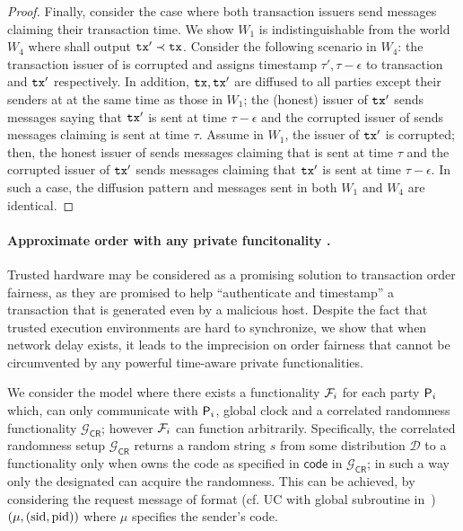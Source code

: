 \begin{proof}
	Finally, consider the case where both transaction issuers send messages claiming their transaction time.
	We show $W_1$ is indistinguishable from the world $W_4$ where \funcFairLedger shall output $\mathtt{tx}' \prec \mathtt{tx}$.
	Consider the following scenario in $W_4$: the transaction issuer of \tx is corrupted and \funcFairLedger assigns timestamp $\tau', \tau - \epsilon$ to transaction \tx and $\mathtt{tx}'$ respectively.
	In addition, $\mathtt{tx}, \mathtt{tx}'$ are diffused to all parties except their senders at at the same time as those in $W_1$; the (honest) issuer of $\mathtt{tx}'$ sends messages saying that $\mathtt{tx}'$ is sent at time $\tau - \epsilon$ and the corrupted issuer of \tx sends messages claiming \tx is sent at time $\tau$.
	Assume in $W_1$, the issuer of $\mathtt{tx}'$ is corrupted; then, the honest issuer of \tx sends messages claiming that \tx is sent at time $\tau$ and the corrupted issuer of $\mathtt{tx}'$ sends messages claiming that $\mathtt{tx}'$ is sent at time $\tau - \epsilon$.
	In such a case, the diffusion pattern and messages sent in both $W_1$ and $W_4$ are identical.
\end{proof}

\paragraph{Approximate order with any private funcitonality \F.}
%
Trusted hardware may be considered as a promising solution to transaction order fairness, as they are promised to help ``authenticate and timestamp'' a transaction that is generated even by a malicious host.
%
Despite the fact that trusted execution environments are hard to synchronize, we show that when network delay exists, it leads to the imprecision on order fairness that cannot be circumvented by any powerful time-aware private functionalities.

We consider the model where there exists a functionality $\mathcal{F}_i$ for each party $\mathsf{P}_i$ which, can only communicate with $\mathsf{P}_i$, global clock \funcClock and a correlated randomness functionality $\mathcal{G}_{\mathsf{CR}}$; however $\mathcal{F}_i$ can function arbitrarily.
%
Specifically, the correlated randomness setup $\mathcal{G}_{\mathsf{CR}}$ returns a random string $s$ from some distribution $\mathcal{D}$ to a functionality \F only when \F owns the code as specified in $\mathsf{code}$ in $\mathcal{G}_{\mathsf{CR}}$; in such a way only the designated \F can acquire the randomness.
%
This can be achieved, by considering the request message of format (cf. UC with global subroutine in~\cite{TCC:BCHTZ20}) $(\mu, (\mathrm{sid}, \mathrm{pid}))$ where $\mu$ specifies the sender's code.


